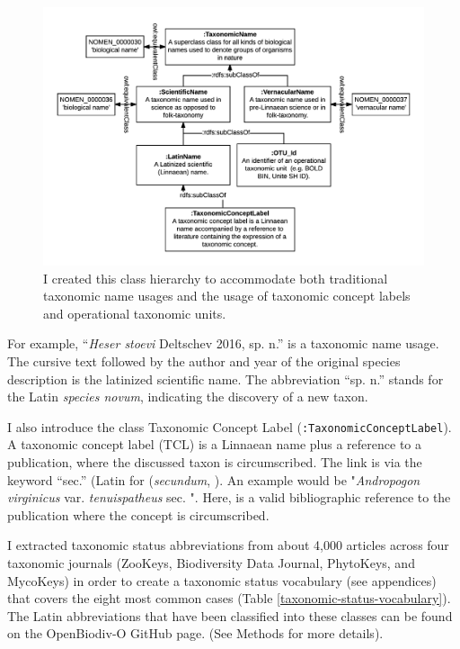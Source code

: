 \begin{figure}[h!]
  \centering
  \includegraphics[width=\textwidth]{Figures/taxonomic-name-class-hierarchy-diagram}
  \decoRule
  \caption[Taxonomic name class hierarchy diagram.]{I created this class hierarchy to accommodate both traditional taxonomic name usages and the usage of taxonomic concept labels and operational taxonomic units.}
  \label{taxonomic-name-class-hierarchy-diagram}
\end{figure}

For example, ``\emph{Heser stoevi} Deltschev 2016, sp. n.'' is a taxonomic name usage. The cursive text followed by the author and year of the original species description is the latinized scientific name. The abbreviation ``sp. n.'' stands for the Latin \emph{species novum}, indicating the discovery of a new taxon.

I also introduce the class Taxonomic Concept Label ({\tt :TaxonomicConceptLabel}). A taxonomic concept label (TCL) is a Linnaean name plus a reference to a publication, where the discussed taxon is circumscribed. The link is via the keyword ``sec.'' (Latin for (\emph{secundum}, \cite{berendsohn_concept_1995}). An example would be "\emph{Andropogon virginicus} var. \emph{tenuispatheus} sec. \cite{blomquist_grasses_1948}". Here, \cite{blomquist_grasses_1948} is a valid bibliographic reference to the publication where the concept is circumscribed.

I extracted taxonomic status abbreviations from about 4,000 articles across four taxonomic journals (ZooKeys, Biodiversity Data Journal, PhytoKeys, and MycoKeys) in order to create a taxonomic status vocabulary (see appendices) that covers the eight most common cases (Table \ref{taxonomic-status-vocabulary}). The Latin abbreviations that have been classified into these classes can be found on the OpenBiodiv-O GitHub page. (See Methods for more details).

